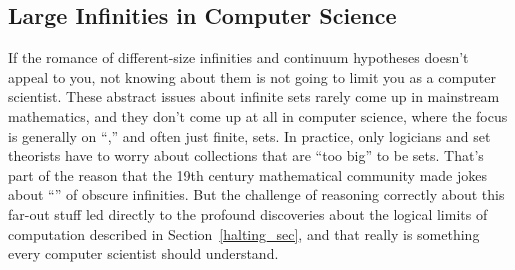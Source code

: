 \subsection{Large Infinities in Computer Science}

If the romance of different-size infinities and continuum hypotheses
doesn't appeal to you, not knowing about them is not going to limit
you as a computer scientist.  These abstract issues about infinite
sets rarely come up in mainstream mathematics, and they don't come up
at all in computer science, where the focus is generally on
``,'' and often just finite, sets.  In practice, only
logicians and set theorists have to worry about collections that are
``too big'' to be sets.  That's part of the reason that the 19th
century mathematical community made jokes about ``'' of obscure infinities.  But the challenge of
reasoning correctly about this far-out stuff led directly to the
profound discoveries about the logical limits of computation described
in Section~\ref{halting_sec}, and that really is something every
computer scientist should understand.

\endinput
